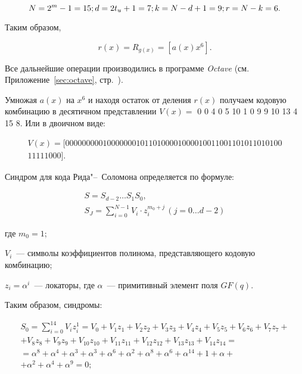 \begin{equation*}
  N = 2^m - 1 = 15;\\
  d = 2t_u + 1 = 7;\\
  k = N - d + 1 = 9;\\
  r = N - k = 6.
\end{equation*}

Таким образом,

\begin{equation*}
  r(x) = R_{g(x)} = \left[a(x)x^6\right].
\end{equation*}

Все дальнейшие операции производились в программе \textit{Octave}
(см. Приложение~\ref{sec:octave}, стр.~\pageref{page}).

Умножая $a(x)$ на $x^6$ и находя остаток от деления $r(x)$ получаем
кодовую комбинацию в десятичном представлении
$V(x) =$ 0    0    4    0    5   10    1    0    9    9   10   13    4
15    8. Или в двоичном виде:

\begin{gather*}
  V(x) = [0000000001000000010110100001000010011001101011010100\\
  11111000].
\end{gather*}

Синдром для кода Рида"--~Соломона определяется по формуле:

\begin{gather*}
  S = S_{d-2} \ldots S_1S_0,\\
  S_J = \sum _{i=0} ^{N-1} V_i \cdot z_i^{m_0+j} \, (j = 0
  \ldots d-2)
\end{gather*}

\begin{ESKDexplanation}
\item[где ] $m_0 = 1$;
\item $V_i$~--- символы коэффициентов полинома, представляющего
  кодовую комбинацию;
\item $z_i = \alpha^i$~--- локаторы, где $\alpha$~--- примитивный
  элемент поля $GF(q)$.
\end{ESKDexplanation}

Таким образом, синдромы:

\begin{gather*}
  S_0 = \sum_{i = 0}^{14}V_iz_i^1 = V_0 + V_1z_1 + V_2z_2 + V_3z_3 +
  V_4z_4 + V_5z_5 + V_6z_6 + V_7z_7 + \\ + V_8z_8 + V_9z_9 +
  V_{10}z_{10} + V_{11}z_{11} + V_{12}z_{12} + V_{13}z_{13} +
  V_{14}z_{14} =  \\ = \alpha^8 + \alpha^4 + \alpha^3 + \alpha^3 +
  \alpha^6 + \alpha^2 + \alpha^8 + \alpha^6 + \alpha^{14} + 1 + \alpha
  + \\ + \alpha^2 + \alpha^4 + \alpha^9 = 0;
\end{gather*}

